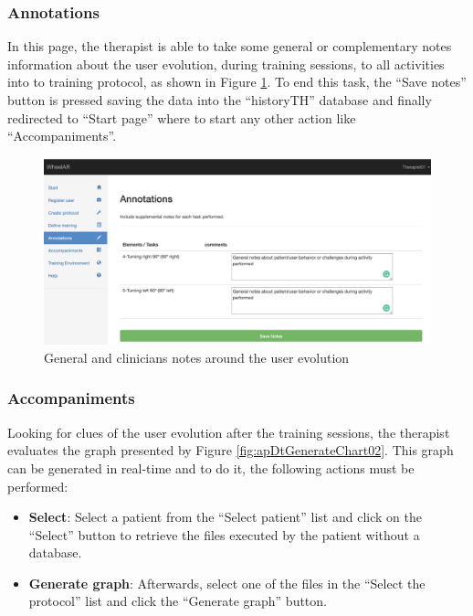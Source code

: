 \subsubsection{Annotations}

In this page, the therapist is able to take some general or complementary notes information about the user evolution, during training sessions, to all activities into to training protocol, as shown in Figure \ref{fig:apDtAnnotations}. To end this task, the ``Save notes'' button is pressed saving the data into the ``historyTH'' database and finally redirected to ``Start page'' where to start any other action like ``Accompaniments''. 

\begin{figure}[!hbt]
\begin{center}
\includegraphics[width=1\linewidth]{img/apendiceD/tAnnotations}
\caption{General and clinicians notes around the user evolution} \label{fig:apDtAnnotations}
\end{center}
\vspace{-15pt}
\end{figure}

\subsubsection{Accompaniments}

Looking for clues of the user evolution after the training sessions, the therapist evaluates the graph presented by Figure \ref{fig:apDtGenerateChart02}. This graph can be generated in real-time and to do it, the following actions must be performed:

\begin{itemize}
\item \textbf{Select}: Select a patient from the ``Select patient'' list and click on the ``Select''  button to retrieve the files executed by the patient without a database. 
\item \textbf{Generate graph}: Afterwards, select one of the files in the ``Select the protocol'' list and click the ``Generate graph'' button. 
\end{itemize}

